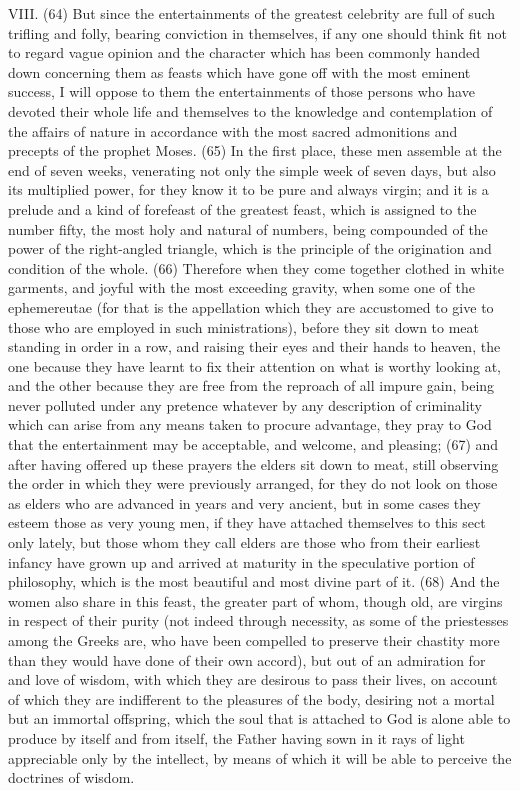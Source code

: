 VIII. (64) But since the entertainments of the greatest celebrity are full of such trifling and folly,
bearing conviction in themselves, if any one should think fit not to regard vague opinion and the
character which has been commonly handed down concerning them as feasts which have gone off
with the most eminent success, I will oppose to them the entertainments of those persons who
have devoted their whole life and themselves to the knowledge and contemplation of the affairs of
nature in accordance with the most sacred admonitions and precepts of the prophet Moses. (65)
In the first place, these men assemble at the end of seven weeks, venerating not only the simple
week of seven days, but also its multiplied power, for they know it to be pure and always virgin; and
it is a prelude and a kind of forefeast of the greatest feast, which is assigned to the number fifty,
the most holy and natural of numbers, being compounded of the power of the right-angled triangle,
which is the principle of the origination and condition of the whole. (66) Therefore when they come
together clothed in white garments, and joyful with the most exceeding gravity, when some one of
the ephemereutae (for that is the appellation which they are accustomed to give to those who are
employed in such ministrations), before they sit down to meat standing in order in a row, and
raising their eyes and their hands to heaven, the one because they have learnt to fix their attention
on what is worthy looking at, and the other because they are free from the reproach of all impure
gain, being never polluted under any pretence whatever by any description of criminality which can
arise from any means taken to procure advantage, they pray to God that the entertainment may be
acceptable, and welcome, and pleasing; (67) and after having offered up these prayers the elders
sit down to meat, still observing the order in which they were previously arranged, for they do not
look on those as elders who are advanced in years and very ancient, but in some cases they
esteem those as very young men, if they have attached themselves to this sect only lately, but
those whom they call elders are those who from their earliest infancy have grown up and arrived at
maturity in the speculative portion of philosophy, which is the most beautiful and most divine part of
it. (68) And the women also share in this feast, the greater part of whom, though old, are virgins in
respect of their purity (not indeed through necessity, as some of the priestesses among the
Greeks are, who have been compelled to preserve their chastity more than they would have done
of their own accord), but out of an admiration for and love of wisdom, with which they are desirous
to pass their lives, on account of which they are indifferent to the pleasures of the body, desiring
not a mortal but an immortal offspring, which the soul that is attached to God is alone able to
produce by itself and from itself, the Father having sown in it rays of light appreciable only by the
intellect, by means of which it will be able to perceive the doctrines of wisdom.

